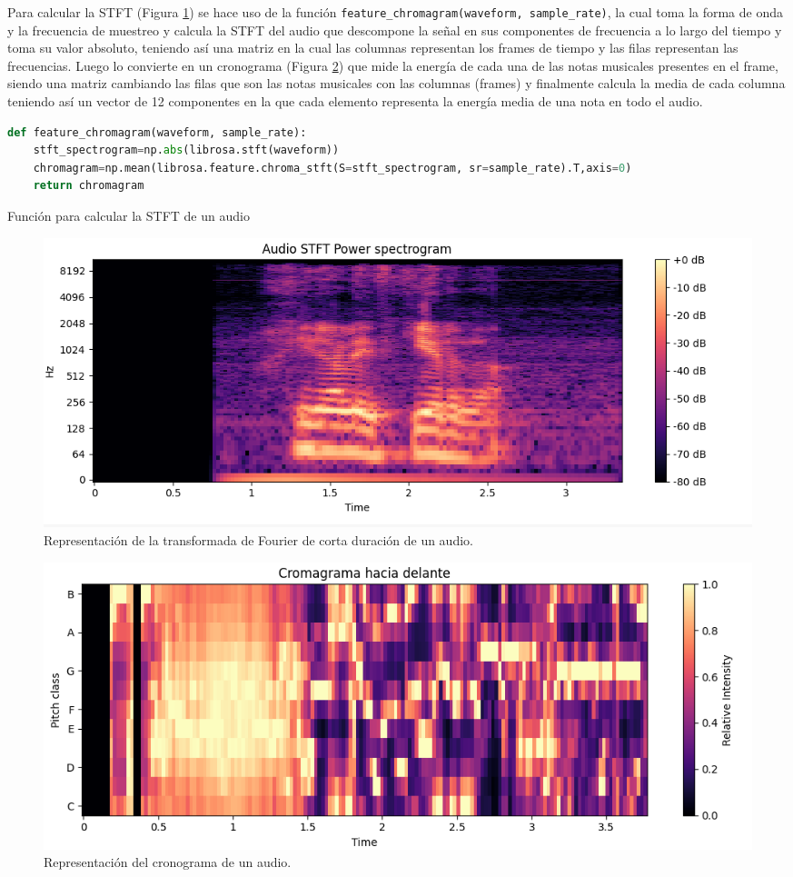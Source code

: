 Para calcular la STFT (Figura \ref{fig:stft}) se hace uso de la función \verb|feature_chromagram(waveform, sample_rate)|, la cual toma la forma de onda y la frecuencia de muestreo y calcula la STFT del audio que descompone la señal en sus componentes de frecuencia a lo largo del tiempo y toma su valor absoluto, teniendo así una matriz en la cual las columnas representan los frames de tiempo y las filas representan las frecuencias. Luego lo convierte en un cronograma (Figura \ref{fig:cronograma}) que mide la energía de cada una de las notas musicales presentes en el frame, siendo una matriz cambiando las filas que son las notas musicales con las columnas (frames) y finalmente calcula la media de cada columna teniendo así un vector de 12 componentes en la que cada elemento representa la energía media de una nota en todo el audio.


\begin{code}[H]
\begin{lstlisting}[language=Python]
def feature_chromagram(waveform, sample_rate):
    stft_spectrogram=np.abs(librosa.stft(waveform))
    chromagram=np.mean(librosa.feature.chroma_stft(S=stft_spectrogram, sr=sample_rate).T,axis=0)
    return chromagram
\end{lstlisting}
\caption[Función para calcular la STFT de un audio]{Función para calcular la STFT de un audio}
\label{cod:codejemplo6}
\end{code}

\begin{figure}[H]
  \centering
  \includegraphics[scale=0.4]{figs/stft_spectogram} %
  \caption{ Representación de la transformada de Fourier de corta duración de un audio.}
  \label{fig:stft}
\end{figure}

\begin{figure}[H]
  \centering
  \includegraphics[scale=0.4]{figs/cromagrama} %
  \caption{ Representación del cronograma de un audio.}
  \label{fig:cronograma}
\end{figure}


